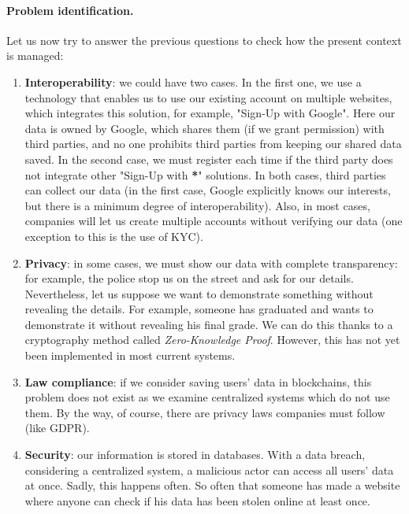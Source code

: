\paragraph{Problem identification.} Let us now try to answer the previous questions 
to check how the present context is managed:
\begin{enumerate}
    \item \textbf{Interoperability}: we could have two cases. In the first one, 
    we use a technology that enables us to use our existing account on 
    multiple websites, which integrates this solution, for example, "Sign-Up 
    with Google". Here our data is owned by Google, which shares them (if we 
    grant permission) with third parties, and no one prohibits third parties 
    from keeping our shared data saved. In the second case, we must register 
    each time if the third party does not integrate other "Sign-Up with \textbf{*}" 
    solutions. In both cases, third parties can collect our data (in the 
    first case, Google explicitly knows our interests, but there is a minimum
    degree of interoperability). Also, in most cases, companies will let us 
    create multiple accounts without verifying our data (one exception to 
    this is the use of KYC).
    \item \textbf{Privacy}: in some cases, we must show our data
    with complete transparency: for example, the police stop us on the 
    street and ask for our details. Nevertheless, let us suppose we want to 
    demonstrate something without revealing the details. For example, 
    someone has graduated and wants to demonstrate it without revealing 
    his final grade. We can do this thanks to a cryptography method 
    called \textit{Zero-Knowledge Proof}\cite{article:zkp}. However, this has not yet been
    implemented in most current systems.
    \item \textbf{Law compliance}: if we consider saving users' data in 
    blockchains, this problem does not exist as we examine centralized 
    systems which do not use them. By the way, of course, there are privacy 
    laws companies must follow (like GDPR).
    \item \textbf{Security}: our information is stored in databases. With 
    a data breach, considering a centralized system, a malicious actor can 
    access all users' data at once. Sadly, this happens often. So often 
    that someone has made a website where anyone can check if his data has 
    been stolen online at least once\cite{site:pwned}.
\end{enumerate}

